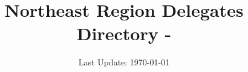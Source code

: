 \documentclass[letterpaper,12pt]{report}
\title{\bf{Northeast Region Delegates Directory - \the\year}}
\author{}
\date{Last Update: \today}
\begin{document}
\begin{titlepage}
\maketitle
\end{titlepage}


\end{document}
